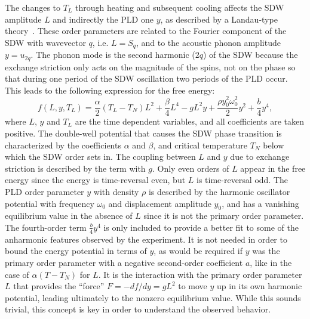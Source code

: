 The changes to $T_L$ through heating and subsequent cooling affects the SDW amplitude $L$ and indirectly the PLD one $y$, as described by a Landau-type theory~\cite{Khomskii2010}.
These order parameters are related to the Fourier component of the SDW with wavevector $q$, i.e. $L = S_q$, and to the acoustic phonon amplitude $y = u_{2q}$.
The phonon mode is the second harmonic ($2q$) of the SDW because the exchange striction only acts on the magnitude of the spins, not on the phase so that during one period of the SDW oscillation two periods of the PLD occur.
This leads to the following expression for the free energy:
\begin{equation}
	\label{eq:Cr_landau}
	f(L, y, T_L) = \frac{\alpha}{2}(T_L - T_N) L^2 + \frac{\beta}{4} L^4 - g L^2 y + \frac{\rho y_0^2 \omega_0^2}{2} y^2 + \frac{b}{4} y^4,
\end{equation}
where $L$, $y$ and $T_L$ are the time dependent variables, and all coefficients are taken positive.
The double-well potential that causes the SDW phase transition is characterized by the coefficients $\alpha$ and $\beta$,  and critical temperature $T_N$ below which the SDW order sets in.
The coupling between $L$ and $y$ due to exchange striction is described by the term with $g$.
Only even orders of $L$ appear in the free energy since the energy is time-reversal even, but $L$ is time-reversal odd.
The PLD order parameter $y$ with density $\rho$ is described by the harmonic oscillator potential with frequency $\omega_0$ and displacement amplitude $y_0$, and has a vanishing equilibrium value in the absence of $L$ since it is not the primary order parameter.
The fourth-order term $\frac{b}{4}y^4$ is only included to provide a better fit to some of the anharmonic features observed by the experiment.
It is not needed in order to bound the energy potential in terms of $y$, as would be required if $y$ was the primary order parameter with a negative second-order coefficient $a$, like in the case of $\alpha(T-T_N)$ for $L$.
It is the interaction with the primary order parameter $L$ that provides the ``force'' $F = -df/dy = gL^2$ to move $y$ up in its own harmonic potential, leading ultimately to the nonzero equilibrium value.
While this sounds trivial, this concept is key in order to understand the observed behavior.

